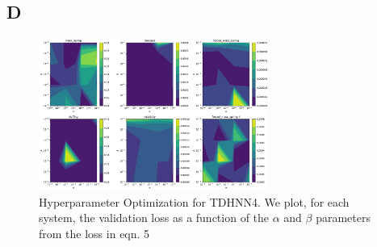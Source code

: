 \documentclass{article}
\begin{document}
\subsection*{D}
\begin{figure}[!htb]
\centering
\includegraphics[width=.5\textwidth, height=5cm]{figures/forceanddampingregulariseroptimisation.pdf}
\caption{Hyperparameter Optimization for TDHNN4. We plot, for each system, the validation loss as a function of the $\alpha$ and $\beta$ parameters from the loss in eqn. 5}
\end{figure}
\end{document}
